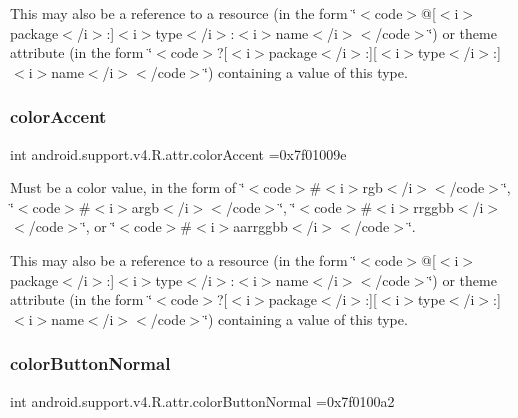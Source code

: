 This may also be a reference to a resource (in the form \char`\"{}$<$code$>$@\mbox{[}$<$i$>$package$<$/i$>$\+:\mbox{]}$<$i$>$type$<$/i$>$\+:$<$i$>$name$<$/i$>$$<$/code$>$\char`\"{}) or theme attribute (in the form \char`\"{}$<$code$>$?\mbox{[}$<$i$>$package$<$/i$>$\+:\mbox{]}\mbox{[}$<$i$>$type$<$/i$>$\+:\mbox{]}$<$i$>$name$<$/i$>$$<$/code$>$\char`\"{}) containing a value of this type. \mbox{\label{classandroid_1_1support_1_1v4_1_1R_1_1attr_a4e16840a7763ba26d0f06f85eb077e73}} 
\subsubsection{\texorpdfstring{color\+Accent}{colorAccent}}
{\footnotesize\ttfamily int android.\+support.\+v4.\+R.\+attr.\+color\+Accent =0x7f01009e\hspace{0.3cm}{\ttfamily [static]}}

Must be a color value, in the form of \char`\"{}$<$code$>$\#$<$i$>$rgb$<$/i$>$$<$/code$>$\char`\"{}, \char`\"{}$<$code$>$\#$<$i$>$argb$<$/i$>$$<$/code$>$\char`\"{}, \char`\"{}$<$code$>$\#$<$i$>$rrggbb$<$/i$>$$<$/code$>$\char`\"{}, or \char`\"{}$<$code$>$\#$<$i$>$aarrggbb$<$/i$>$$<$/code$>$\char`\"{}. 

This may also be a reference to a resource (in the form \char`\"{}$<$code$>$@\mbox{[}$<$i$>$package$<$/i$>$\+:\mbox{]}$<$i$>$type$<$/i$>$\+:$<$i$>$name$<$/i$>$$<$/code$>$\char`\"{}) or theme attribute (in the form \char`\"{}$<$code$>$?\mbox{[}$<$i$>$package$<$/i$>$\+:\mbox{]}\mbox{[}$<$i$>$type$<$/i$>$\+:\mbox{]}$<$i$>$name$<$/i$>$$<$/code$>$\char`\"{}) containing a value of this type. \mbox{\label{classandroid_1_1support_1_1v4_1_1R_1_1attr_a6d8ed605776f3064c9eccb0a7be8f328}} 
\subsubsection{\texorpdfstring{color\+Button\+Normal}{colorButtonNormal}}
{\footnotesize\ttfamily int android.\+support.\+v4.\+R.\+attr.\+color\+Button\+Normal =0x7f0100a2\hspace{0.3cm}{\ttfamily [static]}}

